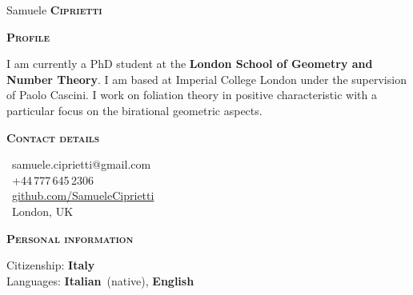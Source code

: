 \documentclass[11pt, a4paper]{article}
\newcommand{\headleft}[1]{\vspace*{3ex}\textsc{\textbf{#1}}\par%
    \vspace*{-1.5ex}\hrulefill\par\vspace*{0.7ex}}
\begin{document}
\setlength{\topskip}{0pt}
\setlength{\parindent}{0pt}
\setlength{\parskip}{0pt}
\setlength{\fboxsep}{0pt}
\pagestyle{empty}
\raggedbottom

\begin{minipage}[t]{0.33\textwidth} %
	\colorbox{cvblue}{\begin{minipage}[t][5mm][t]{\textwidth}\null\hfill\null\end{minipage}}

	\vspace{-.2ex} %
	\colorbox{cvblue!90}{\color{white}  %
		\textwidth\relax%
		\begin{minipage}[t][293mm][t]{0.82\textwidth}
			\raggedright
			\vspace*{2.5ex}

			\Large Samuele \textbf{\textsc{Ciprietti}} \normalsize


			\vspace*{0.5ex} %

			\headleft{Profile}
			I am currently a PhD student at the \textbf{London School of Geometry and Number Theory}. I am based at Imperial College London under the supervision of Paolo Cascini. I work on foliation theory in positive characteristic with a particular focus on the birational geometric aspects.

			\headleft{Contact details}
			\small %
			\MVAt\ {\small samuele.ciprietti@gmail.com} \\[0.4ex]
			\Mobilefone\ +44\,777\,645\,2306 \\[0.5ex]
			\Mundus\ \href{https://github.com/SamueleCiprietti}{github.com/SamueleCiprietti} \\[0.1ex]
			\Letter\ London, UK
			\normalsize

			\headleft{Personal information}
			Citizenship: \textbf{Italy} \\[0.5ex]
			Languages: \textbf{Italian}~(native), \textbf{English}


		\end{minipage}%
		\textwidth\relax%
	}
\end{minipage}%
\end{document}
